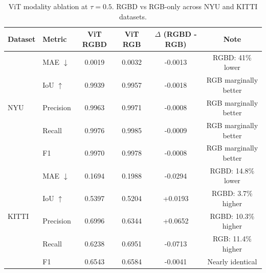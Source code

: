\begin{table}[h]
  \centering
  \caption{ViT modality ablation at $\tau=0.5$. RGBD vs RGB-only across NYU and KITTI datasets.}
  \label{tab:vit_modality_metrics}
  \begin{tabular}{llcccc}
    \toprule
    Dataset & Metric & ViT RGBD & ViT RGB & $\Delta$ (RGBD - RGB) & Note \\ 
    \midrule
    \multirow{5}{*}{NYU} 
      & MAE $\downarrow$ & 0.0019 & 0.0032 & -0.0013 & RGBD: 41\% lower \\
      & IoU $\uparrow$ & 0.9939 & 0.9957 & -0.0018 & RGB marginally better \\
      & Precision & 0.9963 & 0.9971 & -0.0008 & RGB marginally better \\
      & Recall & 0.9976 & 0.9985 & -0.0009 & RGB marginally better \\
      & F1 & 0.9970 & 0.9978 & -0.0008 & RGB marginally better \\
    \midrule
    \multirow{5}{*}{KITTI} 
      & MAE $\downarrow$ & 0.1694 & 0.1988 & -0.0294 & RGBD: 14.8\% lower \\
      & IoU $\uparrow$ & 0.5397 & 0.5204 & +0.0193 & RGBD: 3.7\% higher \\
      & Precision & 0.6996 & 0.6344 & +0.0652 & RGBD: 10.3\% higher \\
      & Recall & 0.6238 & 0.6951 & -0.0713 & RGB: 11.4\% higher \\
      & F1 & 0.6543 & 0.6584 & -0.0041 & Nearly identical \\
    \bottomrule
  \end{tabular}
\end{table}
